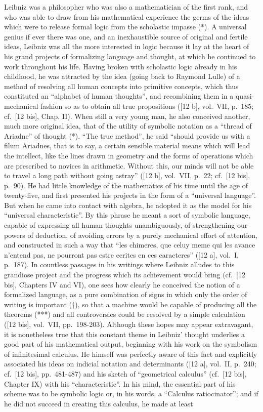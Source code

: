 Leibniz was a philosopher who was also a mathematician of the first rank, and who was able to draw from his mathematical experience the germs of the ideas which were to release formal logic from the scholastic impasse (*). A universal genius if ever there was one, and an inexhaustible source of original and fertile ideas, Leibniz was all the more interested in logic because it lay at the heart of his grand projects of formalizing language and thought, at which he continued to work throughout his life. Having broken with scholastic logic already in his childhood, he was attracted by the idea (going back to Raymond Lulle) of a method of resolving all human concepts into primitive concepts, which thus constituted an ``alphabet of human thoughts'', and recombining them in a quasi-mechanical fashion so as to obtain all true propositions ({[}12 b{]}, vol.~VII, p.~185; cf.~{[}12 bis{]}, Chap. II). When still a very young man, he also conceived another, much more original idea, that of the utility of symbolic notation as a ``thread of Ariadne'' of thought (*). ``The true method'', he said ``should provide us with a filum Ariadnes, that is to say, a certain sensible material means which will lead the intellect, like the lines drawn in geometry and the forms of operations which are prescribed to novices in arithmetic. Without this, our minds will not be able to travel a long path without going astray'' ({[}12 b{]}, vol.~VII, p.~22; cf.~{[}12 bis{]}, p.~90). He had little knowledge of the mathematics of his time until the age of twenty-five, and first presented his projects in the form of a ``universal language''. But when he came into contact with algebra, he adopted it as the model for his ``universal characteristic''. By this phrase he meant a sort of symbolic language, capable of expressing all human thoughts unambiguously, of strengthening our powers of deduction, of avoiding errors by a purely mechanical effort of attention, and constructed in such a way that ``les chimeres, que celuy meme qui les avance n'entend pas, ne pourront pas estre ecrites en ces caracteres'' ({[}12 a{]}, vol.~I, p.~187). In countless passages in his writings where Leibniz alludes to this grandiose project and the progress which its achievement would bring (cf.~{[}12 bis{]}, Chapters IV and VI), one sees how clearly he conceived the notion of a formalized language, as a pure combination of signs in which only the order of writing is important (†), so that a machine would be capable of producing all the theorems (***) and all controversies could be resolved by a simple calculation ({[}12 bis{]}, vol.~VII, pp.~198-203). Although these hopes may appear extravagant, it is nonetheless true that this constant theme in Leibniz' thought underlies a good part of his mathematical output, beginning with his work on the symbolism of infinitesimal calculus. He himself was perfectly aware of this fact and explicitly associated his ideas on indicial notation and determinants ({[}12 a{]}, vol.~II, p.~240; cf.~{[}12 bis{]}, pp.~481-487) and his sketch of ``geometrical calculus'' (cf.~{[}12 bis{]}, Chapter IX) with his ``characteristic''. In his mind, the essential part of his scheme was to be symbolic logic or, in his words, a ``Calculus ratiocinator''; and if he did not succeed in creating this calculus, he made at least 